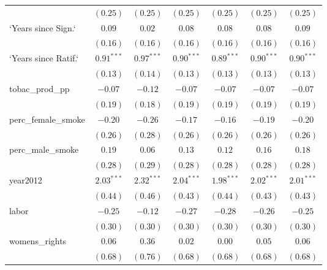 \begin{table}[!h]
\begin{center}
\begin{tabular}{l c c c c c c }
                        & $(0.25)$     & $(0.25)$     & $(0.25)$     & $(0.25)$     & $(0.25)$     & $(0.25)$     \\
`Years since Sign.`     & $0.09$       & $0.02$       & $0.08$       & $0.08$       & $0.08$       & $0.09$       \\
                        & $(0.16)$     & $(0.16)$     & $(0.16)$     & $(0.16)$     & $(0.16)$     & $(0.16)$     \\
`Years since Ratif.`    & $0.91^{***}$ & $0.97^{***}$ & $0.90^{***}$ & $0.89^{***}$ & $0.90^{***}$ & $0.90^{***}$ \\
                        & $(0.13)$     & $(0.14)$     & $(0.13)$     & $(0.13)$     & $(0.13)$     & $(0.13)$     \\
tobac\_prod\_pp         & $-0.07$      & $-0.12$      & $-0.07$      & $-0.07$      & $-0.07$      & $-0.07$      \\
                        & $(0.19)$     & $(0.18)$     & $(0.19)$     & $(0.19)$     & $(0.19)$     & $(0.19)$     \\
perc\_female\_smoke     & $-0.20$      & $-0.26$      & $-0.17$      & $-0.16$      & $-0.19$      & $-0.20$      \\
                        & $(0.26)$     & $(0.28)$     & $(0.26)$     & $(0.26)$     & $(0.26)$     & $(0.26)$     \\
perc\_male\_smoke       & $0.19$       & $0.06$       & $0.13$       & $0.12$       & $0.16$       & $0.18$       \\
                        & $(0.28)$     & $(0.29)$     & $(0.28)$     & $(0.28)$     & $(0.28)$     & $(0.28)$     \\
year2012                & $2.03^{***}$ & $2.32^{***}$ & $2.04^{***}$ & $1.98^{***}$ & $2.02^{***}$ & $2.01^{***}$ \\
                        & $(0.44)$     & $(0.46)$     & $(0.43)$     & $(0.44)$     & $(0.43)$     & $(0.43)$     \\
labor                   & $-0.25$      & $-0.12$      & $-0.27$      & $-0.28$      & $-0.26$      & $-0.25$      \\
                        & $(0.30)$     & $(0.30)$     & $(0.30)$     & $(0.30)$     & $(0.30)$     & $(0.30)$     \\
womens\_rights          & $0.06$       & $0.36$       & $0.02$       & $0.00$       & $0.05$       & $0.06$       \\
                        & $(0.68)$     & $(0.76)$     & $(0.68)$     & $(0.68)$     & $(0.68)$     & $(0.68)$     \\

\end{tabular}
\end{center}
\end{table}
